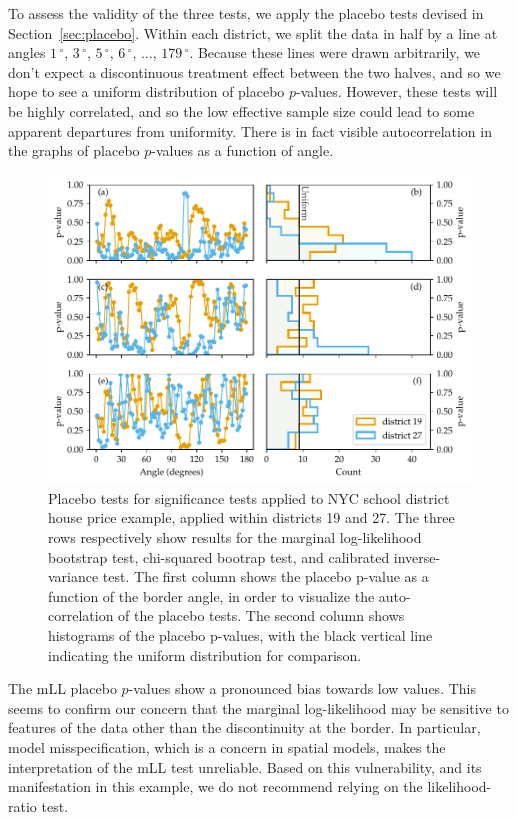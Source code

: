\documentclass[letter]{article}
\makeatletter
\def\maxwidth{\ifdim\Gin@nat@width>\linewidth\linewidth
\else\Gin@nat@width\fi}
\let\Oldincludegraphics\includegraphics
\renewcommand{\includegraphics}[1]{\Oldincludegraphics[width=0.9\maxwidth]{#1}}
\newcommand{\degree}{{\,^\circ}}
\makeatother
\begin{document}
    	To assess the validity of the three tests, we apply the placebo tests devised in Section~\ref{sec:placebo}.
Within each district, we split the data in half by a line at angles \(1\degree\), \(3\degree\), \(5\degree\), \(6\degree\), \(\dotsc\), \(179\degree\).
Because these lines were drawn arbitrarily, we don't expect a discontinuous treatment effect between the two halves, and so we hope to see a uniform distribution of placebo \(p\)-values.
However, these tests will be highly correlated,
and so the low effective sample size could lead to some apparent departures from uniformity.
There is in fact visible autocorrelation in the graphs of placebo \(p\)-values as a function of angle.
    


    	\begin{figure}
\centering
\includegraphics{../NYC/NYC_plots/NYC_placebos.pdf}
\caption{\label{fig:nyc_placebos} Placebo tests for significance tests applied to NYC school district house price example, applied within districts 19 and 27. The three rows respectively show results for the marginal log-likelihood bootstrap test, chi-squared bootrap test, and calibrated inverse-variance test. The first column shows the placebo p-value as a function of the border angle, in order to visualize the auto-correlation of the placebo tests. The second column shows histograms of the placebo p-values, with the black vertical line indicating the uniform distribution for comparison.}
\end{figure}
    


    	The mLL placebo \(p\)-values show a pronounced bias towards low values.
This seems to confirm our concern that the marginal log-likelihood may be sensitive to features of the data other than the discontinuity at the border.
In particular, model misspecification, which is a concern in spatial models, makes the interpretation of the mLL test unreliable.
Based on this vulnerability, and its manifestation in this example, we do not recommend relying on the likelihood-ratio test.
\end{document}
